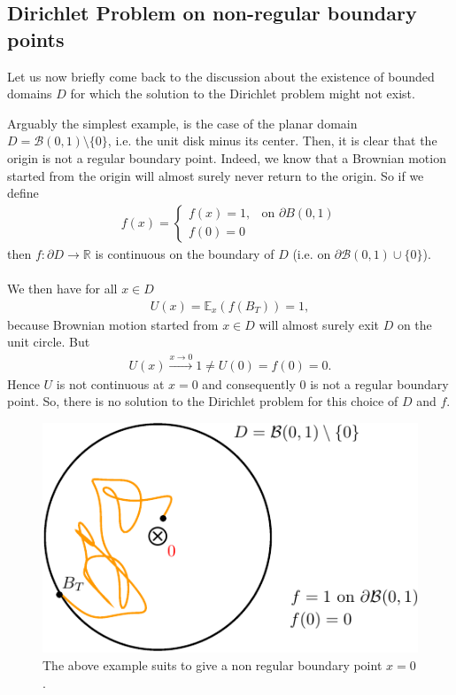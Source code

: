 \documentclass[../mainfile.tex]{subfiles}
\begin{document}
\subsection{Dirichlet Problem on non-regular boundary points}
Let us now briefly come back to the discussion about the existence of bounded domains $D$ for which the solution to the Dirichlet problem might not exist. 
\begin{exmp} Arguably the simplest example, is the case of the planar domain $D= \mathcal{B}(0,1) \setminus \{0\}$, i.e. the unit disk minus its center. Then, it is clear that the origin is not a regular boundary point. Indeed, we know that a Brownian motion started from the origin will almost surely never return to the origin. So if we define
\begin{align*}
f(x) = \begin{cases} f(x)=1, & \text{on } \partial B(0,1) \\
 f(0)=0 \end{cases}
\end{align*}
then $f: \partial D \to \mathbb{R}$ is continuous on the boundary of $D$ (i.e. on $\partial \mathcal{B}(0,1) \cup \{0\}$). 
\\\\
We then have for all $x \in D$ 
\begin{align*}
U(x)= \mathbb{E}_x(f(B_T))=1,
\end{align*}
because Brownian motion started from $x \in D$ will almost surely exit $D$ on the unit circle. But  \begin{align*}
U(x) \overset{x \to 0}\longrightarrow 1 \neq U(0) =f(0)=0.
\end{align*}
Hence $U$ is not continuous at $x=0$ and consequently $0$ is not a regular boundary point. So, there is no solution to the Dirichlet problem for this choice of $D$ and $f$. 
\end{exmp}
\begin{figure}[hbtp]
\centering
\includegraphics[scale=.9]{nonregularboundary.pdf}
\caption{The above example suits to give a non regular boundary point $x=0$.}
\end{figure}
\end{document}
